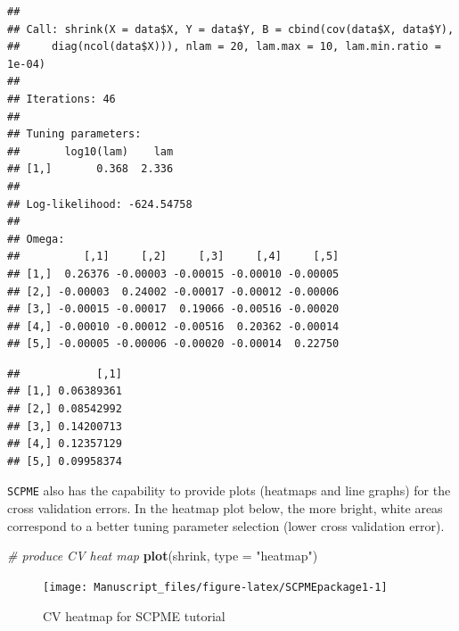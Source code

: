\documentclass[11pt,]{report}
\newenvironment{Shaded}{\begin{snugshade}}{\end{snugshade}}
\newcommand{\CommentTok}[1]{\textcolor[rgb]{0.56,0.35,0.01}{\textit{#1}}}
\newcommand{\DataTypeTok}[1]{\textcolor[rgb]{0.13,0.29,0.53}{#1}}
\newcommand{\DecValTok}[1]{\textcolor[rgb]{0.00,0.00,0.81}{#1}}
\newcommand{\KeywordTok}[1]{\textcolor[rgb]{0.13,0.29,0.53}{\textbf{#1}}}
\newcommand{\NormalTok}[1]{#1}
\newcommand{\OperatorTok}[1]{\textcolor[rgb]{0.81,0.36,0.00}{\textbf{#1}}}
\newcommand{\OtherTok}[1]{\textcolor[rgb]{0.56,0.35,0.01}{#1}}
\newcommand{\StringTok}[1]{\textcolor[rgb]{0.31,0.60,0.02}{#1}}
\begin{document}
\begin{verbatim}
## 
## Call: shrink(X = data$X, Y = data$Y, B = cbind(cov(data$X, data$Y), 
##     diag(ncol(data$X))), nlam = 20, lam.max = 10, lam.min.ratio = 1e-04)
## 
## Iterations: 46
## 
## Tuning parameters:
##       log10(lam)    lam
## [1,]       0.368  2.336
## 
## Log-likelihood: -624.54758
## 
## Omega:
##          [,1]     [,2]     [,3]     [,4]     [,5]
## [1,]  0.26376 -0.00003 -0.00015 -0.00010 -0.00005
## [2,] -0.00003  0.24002 -0.00017 -0.00012 -0.00006
## [3,] -0.00015 -0.00017  0.19066 -0.00516 -0.00020
## [4,] -0.00010 -0.00012 -0.00516  0.20362 -0.00014
## [5,] -0.00005 -0.00006 -0.00020 -0.00014  0.22750
\end{verbatim}

\begin{Shaded}
\end{Shaded}

\begin{verbatim}
##            [,1]
## [1,] 0.06389361
## [2,] 0.08542992
## [3,] 0.14200713
## [4,] 0.12357129
## [5,] 0.09958374
\end{verbatim}

\vspace{0.5cm}

\texttt{SCPME} also has the capability to provide plots (heatmaps and line graphs) for the cross validation errors. In the heatmap plot below, the more bright, white areas correspond to a better tuning parameter selection (lower cross validation error).

\vspace{0.5cm}

\begin{Shaded}
\begin{Highlighting}[]
\CommentTok{# produce CV heat map}
\KeywordTok{plot}\NormalTok{(shrink, }\DataTypeTok{type =} \StringTok{"heatmap"}\NormalTok{)}
\end{Highlighting}
\end{Shaded}

\begin{figure}

{\centering \texttt{[image: Manuscript\_files/figure-latex/SCPMEpackage1-1]} 

}

\caption{CV heatmap for SCPME tutorial}\label{fig:SCPMEpackage1}
\end{figure}
\end{document}
